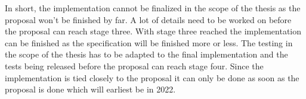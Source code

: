 In short, the implementation cannot be finalized in the scope of the thesis as the proposal won't be finished by far. A lot of details need to be worked on before the proposal can reach stage three. With stage three reached the implementation can be finished as the specification will be finished more or less. The testing in the scope of the thesis has to be adapted to the final implementation and the tests being released before the proposal can reach stage four. Since the implementation is tied closely to the proposal it can only be done as soon as the proposal is done which will earliest be in 2022.

